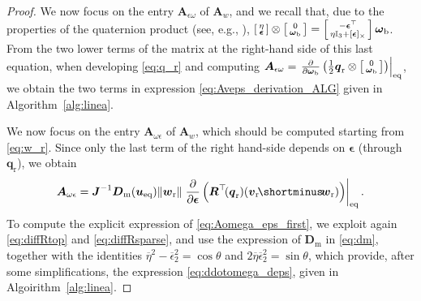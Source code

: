 \begin{proof}
We now focus on the entry $\boldsymbol{A}_{\epsilon \omega}$ of 
$\boldsymbol{A}_{w}$, and we recall that,
due to the properties of the quaternion product (see, e.g., \cite{hamel_minhduc}), 
$\left[ \begin{smallmatrix}\eta \\ \boldsymbol{\epsilon} \end{smallmatrix} \right] \otimes \left[ \begin{smallmatrix}0 \\ 
\boldsymbol{\omega}_{\mathrm{b}} \end{smallmatrix} \right] = 
\left[ \begin{smallmatrix} - \boldsymbol{\epsilon}^\top  \\ 
\eta \mathbb{I}_{3}   + [ \boldsymbol{\epsilon}]_{\times} 
 \end{smallmatrix} \right] \boldsymbol{\omega}_{\mathrm{b}}$. 
From the two lower terms of the matrix at the right-hand side of this last equation, when developing \eqref{eq:q_r}
and computing $\boldsymbol{A}_{\epsilon \omega} = \left. \frac{\partial }{\partial \boldsymbol{\omega}_{\text{b}}} \left( \frac{1}{2} \boldsymbol{{q}}_{\text{r}}  \otimes \left[ \begin{smallmatrix}0 \\ \boldsymbol{\omega}_{\text{b}} \end{smallmatrix} \right] \right) \right|_{\mathrm{eq}}$,
we obtain the two terms in expression \eqref{eq:Aveps_derivation_ALG} given in Algorithm~\ref{alg:linea}.

We now focus on the entry 
$\boldsymbol{A}_{\omega \epsilon}$ of 
$\boldsymbol{A}_{w}$, which should be computed starting from \eqref{eq:w_r}. Since only the last term of the right hand-side depends on $\boldsymbol{\epsilon}$ (through $\boldsymbol{q}_{\mathrm r}$), we obtain
\begin{align}
\label{eq:Aomega_eps_first}
\boldsymbol{A}_{ \omega \epsilon} =  \boldsymbol{J}^{-1}
\boldsymbol{D}_{\mathrm{m}} (\boldsymbol{u}_{\text{eq}}) \lVert  \boldsymbol{w}_{\mathrm{r}} \rVert 
\left. 
\frac{\partial }{\partial \boldsymbol{\epsilon}} \left( \boldsymbol{R}^\top \!(\boldsymbol{q}_{\mathrm{r}}) (\boldsymbol{v}_{\mathrm{r}} \! \shortminus \! \boldsymbol{w}_{\text{r}}) \right) \right|_{\mathrm{eq}}.
\end{align}
To compute the explicit expression of \eqref{eq:Aomega_eps_first}, we exploit again \eqref{eq:diffRtop} and \eqref{eq:diffRsparse}, and use the expression of $\boldsymbol{D}_{\mathrm{m}}$ in \eqref{eq:dm}, together with the identities $\overline \eta^2 - \overline \epsilon_2^2 = \cos \theta$ and $2\overline \eta \overline \epsilon_2^2 = \sin \theta$, which provide, after some simplifications, the expression \eqref{eq:ddotomega_deps}, given in Algoirithm~\ref{alg:linea}.


\end{proof}
